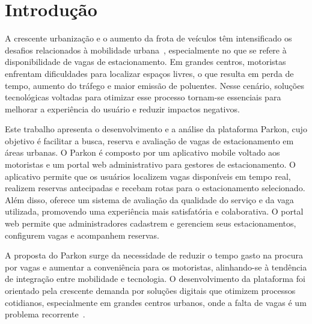 
\chapter{Introdução}
\label{cap:introducao}

A crescente urbanização e o aumento da frota de veículos têm intensificado os desafios relacionados à mobilidade urbana~\cite{miranda2011}, especialmente no que se refere à disponibilidade de vagas de estacionamento. Em grandes centros, motoristas enfrentam dificuldades para localizar espaços livres, o que resulta em perda de tempo, aumento do tráfego e maior emissão de poluentes. Nesse cenário, soluções tecnológicas voltadas para otimizar esse processo tornam-se essenciais para melhorar a experiência do usuário e reduzir impactos negativos.

Este trabalho apresenta o desenvolvimento e a análise da plataforma Parkon, cujo objetivo é facilitar a busca, reserva e avaliação de vagas de estacionamento em áreas urbanas. O Parkon é composto por um aplicativo mobile voltado aos motoristas e um portal web administrativo para gestores de estacionamento. O aplicativo permite que os usuários localizem vagas disponíveis em tempo real, realizem reservas antecipadas e recebam rotas para o estacionamento selecionado. Além disso, oferece um sistema de avaliação da qualidade do serviço e da vaga utilizada, promovendo uma experiência mais satisfatória e colaborativa. O portal web permite que administradores cadastrem e gerenciem seus estacionamentos, configurem vagas e acompanhem reservas.

A proposta do Parkon surge da necessidade de reduzir o tempo gasto na procura por vagas e aumentar a conveniência para os motoristas, alinhando-se à tendência de integração entre mobilidade e tecnologia. O desenvolvimento da plataforma foi orientado pela crescente demanda por soluções digitais que otimizem processos cotidianos, especialmente em grandes centros urbanos, onde a falta de vagas é um problema recorrente~\cite{wang2011}.

